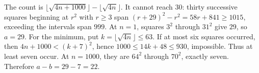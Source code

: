 The count is $\lfloor\sqrt{4n+1000}\rfloor-\lfloor\sqrt{4n}\rfloor$. It cannot reach $30$: thirty successive squares beginning at $r^2$ with $r\ge3$ span $(r+29)^2-r^2=58r+841\ge1015$, exceeding the interval\textquotesingle s span $999$. At $n=1$, squares $3^2$ through $31^2$ give $29$, so $a=29$. For the minimum, put $k=\lfloor\sqrt{4n}\rfloor\le63$. If at most six squares occurred, then $4n+1000<(k+7)^2$, hence $1000\le14k+48\le930$, impossible. Thus at least seven occur. At $n=1000$, they are $64^2$ through $70^2$, exactly seven. Therefore $\boxed{a-b=29-7=22}$.
